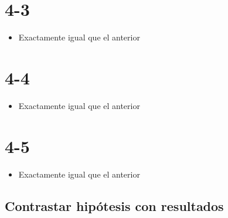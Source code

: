 \begin{note}
\section*{4-3}
\begin{itemize}
  \item Exactamente igual que el anterior
\end{itemize}

\section*{4-4}
\begin{itemize}
  \item Exactamente igual que el anterior
\end{itemize}

\section*{4-5}
\begin{itemize}
  \item Exactamente igual que el anterior
\end{itemize}

\end{note}
\begin{note}
  \section{Contrastar hipótesis con resultados}
\end{note}
